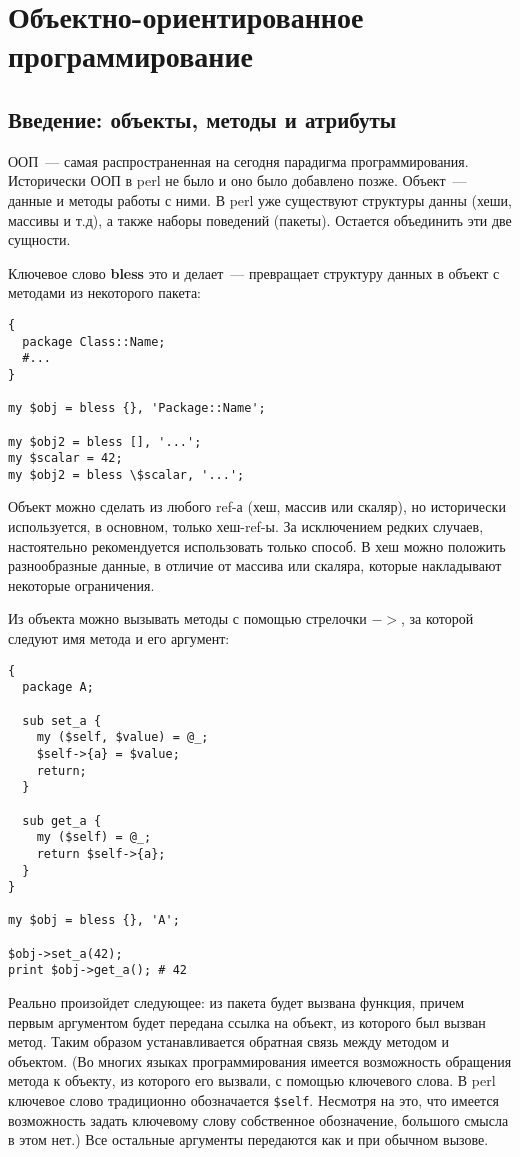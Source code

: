 \setcounter{chapter}{5}
\chapter{Объектно-ориентированное программирование}
\section{Введение: объекты, методы и атрибуты} %
ООП~--- самая распространенная на сегодня парадигма программирования. Исторически ООП в perl не было и оно было добавлено позже. Объект~--- данные и методы работы с ними. В perl уже существуют структуры данны (хеши, массивы и т.д), а также наборы поведений (пакеты). Остается объединить эти две сущности.

Ключевое слово \textbf{bless} это и делает~--- превращает структуру данных в объект с методами из некоторого пакета:
\begin{verbatim}
{
  package Class::Name;
  #...
}

my $obj = bless {}, 'Package::Name';

my $obj2 = bless [], '...';
my $scalar = 42;
my $obj2 = bless \$scalar, '...';

\end{verbatim}
Объект можно сделать из любого ref-а (хеш, массив или скаляр), но исторически используется, в основном, только хеш-ref-ы. За исключением редких случаев, настоятельно рекомендуется использовать только способ. В хеш можно положить разнообразные данные, в отличие от массива или скаляра, которые накладывают некоторые ограничения.

Из объекта можно вызывать методы с помощью стрелочки $->$, за которой следуют имя метода и его аргумент:
\begin{verbatim}
{
  package A;

  sub set_a {
    my ($self, $value) = @_;
    $self->{a} = $value;
    return;
  }

  sub get_a {
    my ($self) = @_;
    return $self->{a};
  }
}

my $obj = bless {}, 'A';

$obj->set_a(42);
print $obj->get_a(); # 42
\end{verbatim}
Реально произойдет следующее: из пакета будет вызвана функция, причем первым аргументом будет передана ссылка на объект, из которого был вызван метод. Таким образом устанавливается обратная связь между методом и объектом.
(Во многих языках программирования имеется возможность обращения метода к объекту, из которого его вызвали, с помощью ключевого слова. В perl ключевое слово традиционно обозначается \verb|$self|. Несмотря на это, что имеется возможность задать ключевому слову собственное обозначение, большого смысла в этом нет.) Все остальные аргументы передаются как и при обычном вызове.

